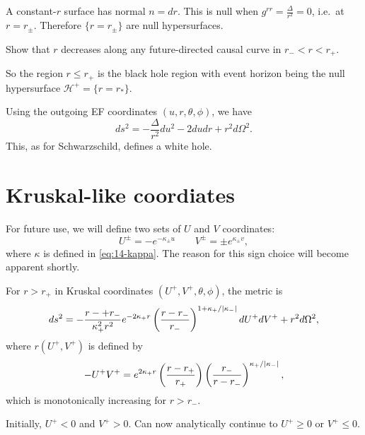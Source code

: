 A constant-$r$ surface has normal $n = dr$. This is null when $g^{rr} = \frac{\Delta}{r^2} = 0$, i.e.~at $r = r_{\pm}$.
Therefore $\{r = r_{\pm}\}$ are null hypersurfaces.
\begin{exercise}
  Show that $r$ decreases along any future-directed causal curve in $r_- < r < r_+$.
\end{exercise}
So the region $r \leq r_+$ is the black hole region with event horizon being the null hypersurface $\mathcal{H}^+ = \{r = r_*\}$.

Using the outgoing EF coordinates $(u, r, \theta, \phi)$, we have
\begin{equation}
  ds^2 = -\frac{\Delta}{r^2} du^2 - 2du dr + r^2 d\Omega^2.
\end{equation}
This, as for Schwarzschild, defines a white hole.

\section{Kruskal-like coordiates}%
\label{sec:kruskal_like_coordiates}

For future use, we will define two sets of $U$ and $V$ coordinates:
\begin{equation}
  \label{eq:14-star}
  U^{\pm} = -e^{-\kappa_{\pm} u} \qquad V^{\pm} = \pm e^{\kappa_{\pm} v},
\end{equation}
where $\kappa$ is defined in \eqref{eq:14-kappa}.
The reason for this sign choice will become apparent shortly.

For $r > r_+$ in Kruskal coordinates $(U^+, V^+, \theta, \phi)$, the metric is
\begin{equation}
  ds^2 = -\frac{r-+ r_-}{\kappa_+^2 r^2} e^{-2 \kappa_+ r} \left( \frac{r - r_-}{r_-} \right)^{1 + \kappa_+/\abs{\kappa_-}} dU^+ dV^+ + r^2 d\Omega^2,
\end{equation}
where $r(U^+, V^+)$ is defined by
\begin{equation}
  -U^+ V^+ = e^{2 \kappa_+ r} \left( \frac{r - r_+}{r_+} \right) \left(\frac{r_-}{r - r_-} \right)^{\kappa_+/\abs{\kappa_-}},
\end{equation}
which is monotonically increasing for $r > r_-$.

Initially, $U^+ < 0$ and $V^+ > 0$.
Can now analytically continue to $U^+ \geq 0$ or $V^+ \leq 0$.
\begin{figure}[tbhp]
  \centering
  \def\svgwidth{0.5\columnwidth}
  
  \caption{}
  \label{fig:l14f1}
\end{figure}

